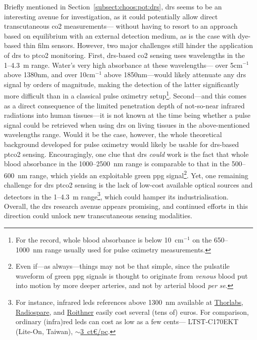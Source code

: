 Briefly mentioned in Section~\ref{subsect:choos:pot:drs}, \gls{drs} seems to be an interesting avenue for investigation, as it could potentially allow direct transcutaneous \gls{co2} measurements---\ie{} without having to resort to an approach based on equilibrium with an external detection medium, as is the case with dye-based thin film sensors. However, two major challenges still hinder the application of \gls{drs} to \gls{ptco2} monitoring. First, \gls{drs}-based \gls{co2} sensing uses wavelengths in the 1--4.3~\textmu{}m range\cite{domjan1994, schaden2004}. Water's very high absorbance at these wavelengths---\ie{} over 5cm$^{-1}$ above 1380nm, and over 10cm$^{-1}$ above 1850nm\cite{kou1993}---would likely attenuate any \gls{drs} signal by orders of magnitude, making the detection of the latter significantly more difficult than in a classical pulse oximetry setup\footnote{For the record, whole blood absorbance is below 10~cm$^{-1}$ on the 650--1000~nm range usually used for pulse oximetry measurements\cite{bosschaart2014}.}. Second---and this comes as a direct consequence of the limited penetration depth of not-so-near infrared radiations into human tissues---it is not known at the time being whether a pulse signal could be retrieved when using \gls{drs} on living tissues in the above-mentioned wavelengths range. Would it be the case, however, the whole theoretical background developed for pulse oximetry would likely be usable for \gls{drs}-based \gls{ptco2} sensing. Encouragingly, one clue that \gls{drs} \emph{could} work is the fact that whole blood absorbance in the 1000--2500~nm range is comparable to that in the 500--600~nm range\cite{bosschaart2014}, which yields an exploitable green \gls{ppg} signal\footnote{Even if---as always---things may not be that simple, since the pulsatile waveform of green \gls{ppg} signals is thought to originate from \emph{venous} blood put into motion by more deeper arteries, and not by arterial blood \textit{per se}\cite{kamshilin2017}.}. Yet, one remaining challenge for \gls{drs} \gls{ptco2} sensing is the lack of low-cost available optical sources and detectors in the 1--4.3~\textmu{}m range\footnote{For instance, infrared \glspl{led} references above 1300~nm available at \href{https://web.archive.org/web/20240929023831/https://www.thorlabs.com/newgrouppage9.cfm?objectgroup_id=2814}{Thorlabs}, \href{http://web.archive.org/web/20241008134940/https://fr.rs-online.com/web/c/afficheurs-et-optoelectronique/led-diodes-electroluminescentes/leds-infrarouges/?applied-dimensions=4291007801\%2C4291007802\%2C4291453920&pn=1&sortBy=P_breakPrice1&sortType=ASC&group_by_tn=false}{Radiospare}, and \href{http://web.archive.org/web/20241008130626/https://www.roithner-laser.com/pricelist.pdf}{Roithner} easily cost several (tens of) euros. For comparison, ordinary (infra)red \glspl{led} can cost as low as a few cents---\eg{} LTST-C170EKT (Lite-On, Taiwan), \href{http://web.archive.org/web/20241009074635/https://fr.rs-online.com/web/p/leds/1689711}{$\sim$3~ct\euro/pc}.}, which could hamper its industrialisation. Overall, the \gls{drs} research avenue appears promising, and continued efforts in this direction could unlock new transcutaneous sensing modalities.

